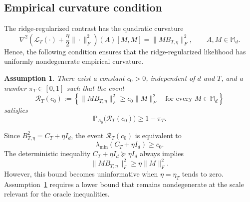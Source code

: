 \documentclass[11pt]{article}
\newtheorem{assumption}[theorem]{Assumption}
\newtheorem{remark}[theorem]{Remark}
\begin{document}
\subsection{Empirical curvature condition}
\label{subsec:empirical-curvature}

The ridge-regularized contrast has the quadratic curvature
\begin{equation}
    \nabla^2\left(
        \mathcal L_T(\cdot)+\frac{\eta}{2}\|\cdot\|_F^2
    \right)(A)[M,M]
    =\|MB_{T,\eta}\|_F^2,
    \qquad A,M\in\mathbb M_d.
\label{eq:regularised-hessian}
\end{equation}
Hence, the following condition ensures that the ridge-regularized likelihood has
uniformly nondegenerate empirical curvature.

\begin{assumption}
\label{ass:empirical-curvature}
There exist a constant $c_0>0$, independent of $d$ and $T$, and a number
$\pi_T\in[0,1]$ such that the event
\begin{equation}
    \mathcal R_T(c_0)
    :=
    \left\{
        \|MB_{T,\eta}\|_F^2\geq c_0\|M\|_F^2
        \quad\text{for every }M\in\mathbb M_d
    \right\}
\label{eq:empirical-curvature-event}
\end{equation}
satisfies
\begin{equation}
    \mathbb P_{A_0}\big(\mathcal R_T(c_0)\big)\geq1-\pi_T.
\label{eq:empirical-curvature-probability}
\end{equation}
\end{assumption}

\noindent
Since $B_{T,\eta}^2=C_T+\eta I_d$, the event
$\mathcal R_T(c_0)$ is equivalent to
\[
    \lambda_{\min}(C_T+\eta I_d)\geq c_0.
\]
The deterministic inequality $C_T+\eta I_d\succeq\eta I_d$ always implies
\[
    \|MB_{T,\eta}\|_F^2\geq\eta\|M\|_F^2.
\]
However, this bound becomes uninformative when $\eta=\eta_T$ tends to zero.
Assumption~\ref{ass:empirical-curvature} requires a lower bound that remains
nondegenerate at the scale relevant for the oracle inequalities. 

\end{document}
